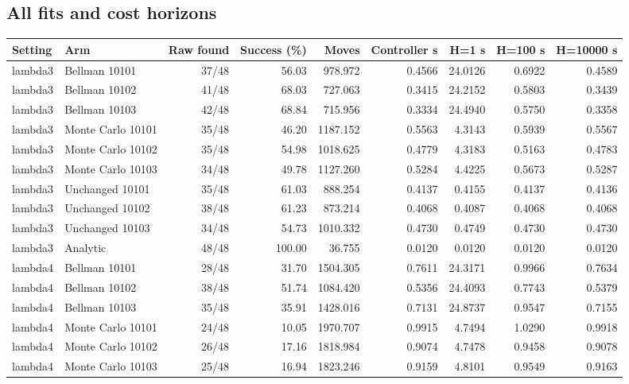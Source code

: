 \documentclass[10pt]{article}
\begin{document}
\begin{landscape}\section{All fits and cost horizons}
{\small\centering\par
\begin{tabular}{llrrrrrrr}
\toprule
Setting & Arm & Raw found & Success (\%) & Moves & Controller s & H=1 s & H=100 s & H=10000 s \\ \midrule
lambda3 & Bellman 10101 & 37/48 & 56.03 & 978.972 & 0.4566 & 24.0126 & 0.6922 & 0.4589 \\
lambda3 & Bellman 10102 & 41/48 & 68.03 & 727.063 & 0.3415 & 24.2152 & 0.5803 & 0.3439 \\
lambda3 & Bellman 10103 & 42/48 & 68.84 & 715.956 & 0.3334 & 24.4940 & 0.5750 & 0.3358 \\
lambda3 & Monte Carlo 10101 & 35/48 & 46.20 & 1187.152 & 0.5563 & 4.3143 & 0.5939 & 0.5567 \\
lambda3 & Monte Carlo 10102 & 35/48 & 54.98 & 1018.625 & 0.4779 & 4.3183 & 0.5163 & 0.4783 \\
lambda3 & Monte Carlo 10103 & 34/48 & 49.78 & 1127.260 & 0.5284 & 4.4225 & 0.5673 & 0.5287 \\
lambda3 & Unchanged 10101 & 35/48 & 61.03 & 888.254 & 0.4137 & 0.4155 & 0.4137 & 0.4136 \\
lambda3 & Unchanged 10102 & 38/48 & 61.23 & 873.214 & 0.4068 & 0.4087 & 0.4068 & 0.4068 \\
lambda3 & Unchanged 10103 & 34/48 & 54.73 & 1010.332 & 0.4730 & 0.4749 & 0.4730 & 0.4730 \\
lambda3 & Analytic & 48/48 & 100.00 & 36.755 & 0.0120 & 0.0120 & 0.0120 & 0.0120 \\
lambda4 & Bellman 10101 & 28/48 & 31.70 & 1504.305 & 0.7611 & 24.3171 & 0.9966 & 0.7634 \\
lambda4 & Bellman 10102 & 38/48 & 51.74 & 1084.420 & 0.5356 & 24.4093 & 0.7743 & 0.5379 \\
lambda4 & Bellman 10103 & 35/48 & 35.91 & 1428.016 & 0.7131 & 24.8737 & 0.9547 & 0.7155 \\
lambda4 & Monte Carlo 10101 & 24/48 & 10.05 & 1970.707 & 0.9915 & 4.7494 & 1.0290 & 0.9918 \\
lambda4 & Monte Carlo 10102 & 26/48 & 17.16 & 1818.984 & 0.9074 & 4.7478 & 0.9458 & 0.9078 \\
lambda4 & Monte Carlo 10103 & 25/48 & 16.94 & 1823.246 & 0.9159 & 4.8101 & 0.9549 & 0.9163 \\

\end{tabular}}
\end{landscape}
\end{document}
